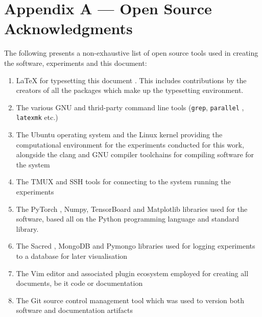 \chapter{Appendix A --- Open Source Acknowledgments}

The following presents a non-exhaustive list of open source tools used in
creating the software, experiments and this document:
\begin{enumerate}
    \item \LaTeX{} for typesetting this document \citep{lamport}. This includes contributions by
        the creators of all the packages which make up the typesetting
        environment.
    \item The various GNU and thrid-party command line tools (\texttt{grep}, \texttt{parallel}
        \citep{tange_ole_2018_1146014}, \texttt{latexmk} etc.)
    \item The Ubuntu operating system and the Linux kernel
        \citep{torvalds2008linux} providing the
        computational environment for the experiments conducted for this work,
        alongside the clang \citep{lattnerLLVM} and GNU compiler toolchains for compiling software
        for the system
    \item The TMUX and SSH tools for connecting to the system running the
        experiments
    \item The PyTorch \citep{paszke2017automatic}, Numpy, TensorBoard and
        Matplotlib libraries \citep{scipy} used for the
        software, based all on the Python programming language and standard
        library.
    \item The Sacred \citep{sacred}, MongoDB and Pymongo libraries used for logging experiments
        to a database for later visualisation
    \item The Vim editor and associated plugin ecosystem employed for creating
        all documents, be it code or documentation
    \item The Git source control management tool which was used to version both
        software and documentation artifacts
\end{enumerate}
